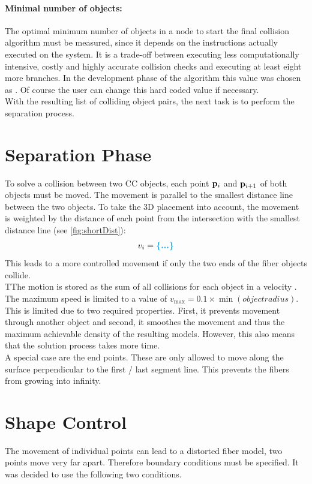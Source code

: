 \paragraph{Minimal number of objects:}
The optimal minimum number of objects in a node to start the final collision algorithm must be measured, since it depends on the instructions actually executed on the system.
It is a trade-off between executing less computationally intensive, costly and highly accurate collision checks and executing at least eight more branches.
In the development phase of the algorithm this value was chosen as \dummy{}.
Of course the user can change this hard coded value if necessary. 
\\
% 
With the resulting list of colliding object pairs, the next task is to perform the separation process.
%
\section{Separation Phase}
To solve a collision between two \ac{CC} objects, each point $\mathbf{p}_i$ and $\mathbf{p}_{i+1}$ of both objects must be moved.
The movement is parallel to the smallest distance line between the two objects.
To take the 3D placement into account, the movement is weighted by the distance of each point from the intersection with the smallest distance line (see \cref{fig:shortDist}):
\begin{align}
v_i = \dummy{}
\end{align}
This leads to a more controlled movement if \eg{} only the two ends of the fiber objects collide.
\\
% 
TThe motion is stored as the sum of all collisions for each object in a velocity .
The maximum speed is limited to a value of $v_{\max} = 0.1 \times \min(\mathit{object radius})$.
This is limited due to two required properties. First, it prevents movement through another object and second, it smoothes the movement and thus the maximum achievable density of the resulting models.
However, this also means that the solution process takes more time.
\\
% 
A special case are the end points.
These are only allowed to move along the surface perpendicular to the first / last segment line.
This prevents the fibers from growing into infinity.
% 
\section{Shape Control}\label{chap5:ShapeControl}
The movement of individual points can lead to a distorted fiber model, \eg{} two points move very far apart.
Therefore boundary conditions must be specified.
It was decided to use the following two conditions.
% 
